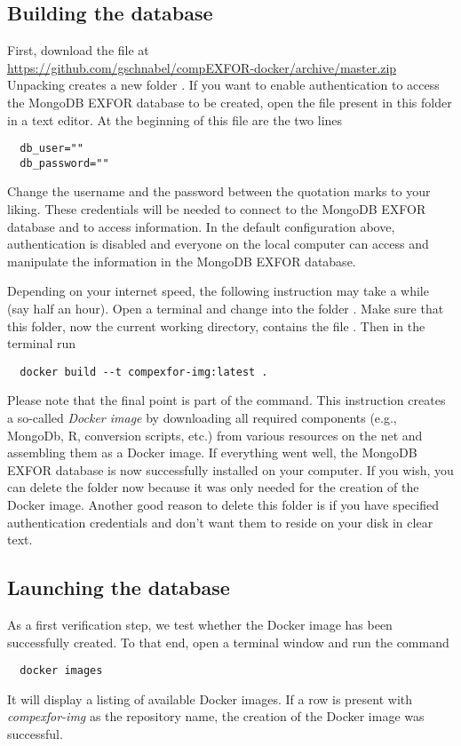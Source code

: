\documentclass[12pt,a4paper]{scrartcl}
\begin{document}
 \subsection{Building the database}
 \label{subsec:build_db}
  
 First, download the file at
 \nopagebreak
 \\[2ex]
 \indent\url{https://github.com/gschnabel/compEXFOR-docker/archive/master.zip}
 \\[2ex]
 \noindent 
 Unpacking creates a new folder .
 If you want to enable authentication to access the MongoDB EXFOR database to be created, open the file  present in this folder in a text editor. At the beginning of this file are the two lines
\begin{verbatim}
  db_user=""
  db_password=""
\end{verbatim}
Change the username and the password between the quotation marks to your liking.
These credentials will be needed to connect to the MongoDB EXFOR database and to access information.
In the default configuration above, authentication is disabled and everyone on the local computer can access and manipulate the information in the MongoDB EXFOR database.


 Depending on your internet speed, the following instruction may take a while (say half an hour).
 Open a terminal and change into the folder .
 Make sure that this folder, now the current working directory, contains the file .
Then in the terminal run
\begin{verbatim}
  docker build --t compexfor-img:latest . 
\end{verbatim}
 Please note that the final point is part of the command.
 This instruction creates a so-called \textit{Docker image} by downloading all required components (e.g., MongoDb, R, conversion scripts, etc.) from various resources on the net and assembling them as a Docker image.
 If everything went well, the MongoDB EXFOR database is now successfully installed on your computer.
 If you wish, you can delete the folder  now because it was only needed for the creation of the Docker image.
 Another good reason to delete this folder is if you have specified authentication credentials and don't want them to reside on your disk in clear text.

 \subsection{Launching the database}
 \label{subsec:launch_database}
 As a first verification step, we test whether the Docker image has been successfully created.
 To that end, open a terminal window and run the command
\begin{verbatim}
  docker images
\end{verbatim}
 It will display a listing of available Docker images.
 If a row is present with \textit{compexfor-img} as the repository name, the creation of the Docker image was successful.
 
\end{document}
